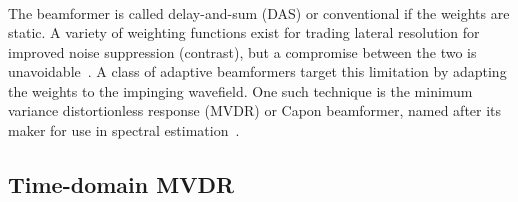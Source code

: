 {\begin{align}
\end{align}
%
%
%
%
%
The beamformer is called delay-and-sum (DAS) or conventional if the weights are static. A variety of weighting functions exist for trading lateral resolution for improved noise suppression (contrast), but a compromise between the two is unavoidable~\cite{Harris1978}. A class of adaptive beamformers target this limitation by adapting the weights to the impinging wavefield. One such technique is the minimum variance distortionless response (MVDR) or Capon beamformer, named after its maker for use in spectral estimation~\cite{Capon1969}.



\subsection{Time-domain MVDR}

%

}
